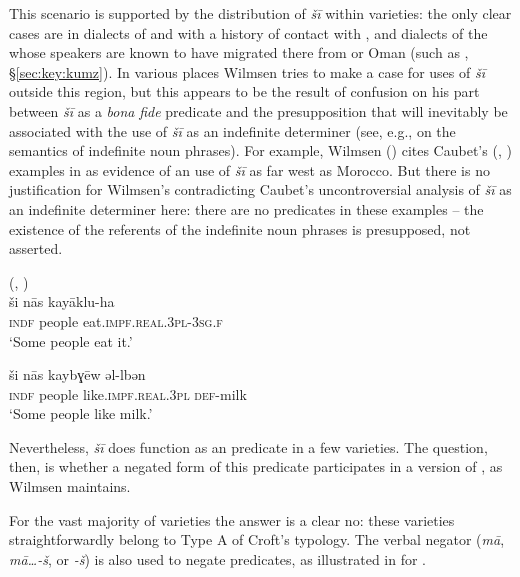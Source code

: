 \documentclass[output=paper]{langsci/langscibook}
\begin{document}
This scenario is supported by the distribution of  \textit{šī} within  varieties: the only clear cases are in dialects of  and  with a history of contact with , and dialects of the  whose speakers are known to have migrated there from  or Oman (such as , §\ref{sec:key:kumz}). In various places Wilmsen tries to make a case for  uses of \textit{šī} outside this region, but this appears to be the result of confusion on his part between \textit{šī} as a \textit{bona} \textit{fide}  predicate and the  presupposition that will inevitably be associated with the use of \textit{šī} as an indefinite determiner (see, e.g., \citealt{Heim1988} on the semantics of indefinite noun phrases). For example, Wilmsen (\citeyear[123]{Wilmsen2014}) cites Caubet’s (\citeyear[123]{Caubet1993a}, \citeyear[280]{Caubet1993b})   examples in  as evidence of an  use of \textit{šī} as far west as Morocco. But there is no justification for Wilmsen’s contradicting Caubet’s uncontroversial analysis of \textit{šī} as an indefinite determiner here: there are no  predicates in these examples – the existence of the referents of the indefinite noun phrases is presupposed, not asserted.

\ea\label{mor}
{  (\citealt[123]{Caubet1993a}, \citealt[280]{Caubet1993b})}\\
\ea\gll ši nās kayāklu-ha\\
     \textsc{indf} people eat.\textsc{impf.real.3pl-3sg.f}  \\
\glt ‘Some people eat it.’

\ex
\gll ši nās kaybɣēw əl-lbən\\
     \textsc{indf} people like.\textsc{impf.real.3pl} \textsc{def-}milk\\
\glt  ‘Some people like milk.’
\z
\z

Nevertheless, \textit{šī} does function as an  predicate in a few  varieties. The question, then, is whether a negated form of this predicate participates in a version of , as Wilmsen maintains.

For the vast majority of  varieties the answer is a clear no: these varieties straightforwardly belong to Type A of Croft’s typology. The verbal negator (\textit{mā}, \textit{mā…-š}, or \textit{{}-š}) is also used to negate  predicates, as illustrated in  for  .\pagebreak\largerpage[2]
\end{document}

